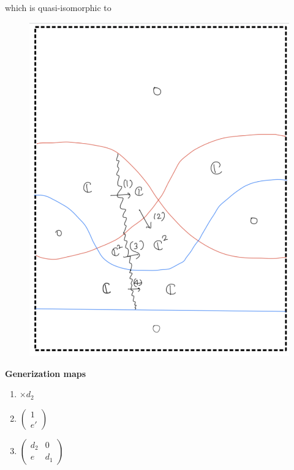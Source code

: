 \begin{enumerate}[label = (\roman*)]
\begin{enumerate}[label = (Step \arabic*)]
\pagebreak
which is quasi-isomorphic to
\begin{figure}[H]
    \centering
    \includegraphics[scale = 0.95]{diagrams/cobord_gen/base_7.png}
    \caption{}
    \label{fig:your-label}
\end{figure}
\pagebreak
\textbf{Generization maps}
\begin{enumerate}[label = (\arabic*)]
\item $\times d_2$

\item 
$\begin{pmatrix}
1 \\
e' 
\end{pmatrix}$

\item 
$\begin{pmatrix}
d_2 & 0 \\
e & d_1
\end{pmatrix}$


\end{enumerate}
\end{enumerate}
\end{enumerate}
